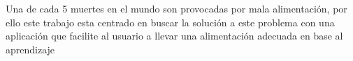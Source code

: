 
Una de cada 5 muertes en el mundo son provocadas por mala alimentación, por ello este trabajo esta centrado en buscar la solución a este problema con una aplicación que facilite al usuario a llevar una alimentación adecuada en base al aprendizaje